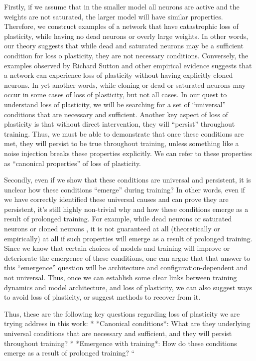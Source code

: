 Firstly, if we assume that in the smaller model all neurons are active and the weights are not saturated, the larger model will have similar properties. Therefore, we construct examples of a network that have catastrophic loss of plasticity, while having no dead neurons or overly large weights. In other words, our theory suggests that while dead and saturated neurons may be a sufficient condition for loss o plasticity, they are not necessary conditions. Conversely, the examples observed by Richard Sutton and other empirical evidence suggests that a network can experience loss of plasticity without having explicitly cloned neurons. In yet another words, while cloning or dead or saturated neurons may occur in some cases of loss of plasticity, but not all cases. In our quest to understand loss of plasticity, we will be searching for a set of “universal” conditions that are necessary and sufficient. Another key aspect of loss of plasticity is that without direct intervention, they will “persist” throughout training. Thus, we must be able to demonstrate  that once these conditions  are met, they will persist to be true throughout training, unless  something like a noise injection breaks these properties explicitly. We can refer to these properties as “canonical properties” of loss of plasticity. 

Secondly, even if we show that these conditions are universal and persistent, it is unclear how these conditions “emerge” during training? In other words, even if we have correctly identified these universal causes and can prove they are persistent, it’s still highly non-trivial why and how these conditions emerge as a result of prolonged training.  For example, while dead neurons or saturated neurons or cloned neurons , it is not guaranteed at all (theoretically or empirically) at all if such properties will emerge as a result of prolonged training. 
Since we know that certain choices of models and training will improve or deteriorate the emergence of these conditions, one can argue that that answer to this “emergence” question will be architecture and configuration-dependent  and not universal. Thus, once we can establish some clear links between training dynamics and model architecture, and loss of plasticity, we can also suggest ways to avoid loss of plasticity, or suggest methods to recover from it. 

Thus, these are the following key questions regarding loss of plasticity we are trying address in this work:
* *Canonical conditions*: What are they underlying universal conditions  that are necessary and sufficient, and they will persist throughout training?  
* *Emergence with training*: How do these conditions emerge as a result of prolonged training? “

